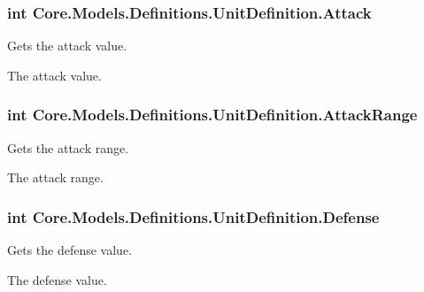 \subsubsection[{Attack}]{\setlength{\rightskip}{0pt plus 5cm}int Core.\+Models.\+Definitions.\+Unit\+Definition.\+Attack\hspace{0.3cm}{\ttfamily [get]}}\label{classCore_1_1Models_1_1Definitions_1_1UnitDefinition_aa796297ed1001668bc576763a1491c31}


Gets the attack value. 

The attack value.\hypertarget{classCore_1_1Models_1_1Definitions_1_1UnitDefinition_a3cabb28335201dd47dc52d2d37144ac7}{}
\subsubsection[{Attack\+Range}]{\setlength{\rightskip}{0pt plus 5cm}int Core.\+Models.\+Definitions.\+Unit\+Definition.\+Attack\+Range\hspace{0.3cm}{\ttfamily [get]}}\label{classCore_1_1Models_1_1Definitions_1_1UnitDefinition_a3cabb28335201dd47dc52d2d37144ac7}


Gets the attack range. 

The attack range.\hypertarget{classCore_1_1Models_1_1Definitions_1_1UnitDefinition_a19782c411903ddedb9a3d35fc2afee55}{}
\subsubsection[{Defense}]{\setlength{\rightskip}{0pt plus 5cm}int Core.\+Models.\+Definitions.\+Unit\+Definition.\+Defense\hspace{0.3cm}{\ttfamily [get]}}\label{classCore_1_1Models_1_1Definitions_1_1UnitDefinition_a19782c411903ddedb9a3d35fc2afee55}


Gets the defense value. 

The defense value.\hypertarget{classCore_1_1Models_1_1Definitions_1_1UnitDefinition_a0b9702e7e97e0038bc52cff2276a1846}{}
